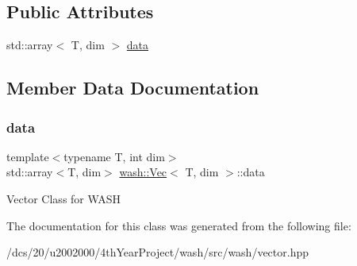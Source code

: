 \subsection*{Public Attributes}
\begin{DoxyCompactItemize}
\item 
std\+::array$<$ T, dim $>$ \mbox{\hyperlink{classwash_1_1Vec_a1f8030900a506e51197d5af4ec4d1143}{data}}
\end{DoxyCompactItemize}


\subsection{Member Data Documentation}
\mbox{\label{classwash_1_1Vec_a1f8030900a506e51197d5af4ec4d1143}} 
\subsubsection{\texorpdfstring{data}{data}}
{\footnotesize\ttfamily template$<$typename T, int dim$>$ \\
std\+::array$<$T, dim$>$ \mbox{\hyperlink{classwash_1_1Vec}{wash\+::\+Vec}}$<$ T, dim $>$\+::data}

Vector Class for W\+A\+SH 

The documentation for this class was generated from the following file\+:\begin{DoxyCompactItemize}
\item 
/dcs/20/u2002000/4th\+Year\+Project/wash/src/wash/vector.\+hpp\end{DoxyCompactItemize}
